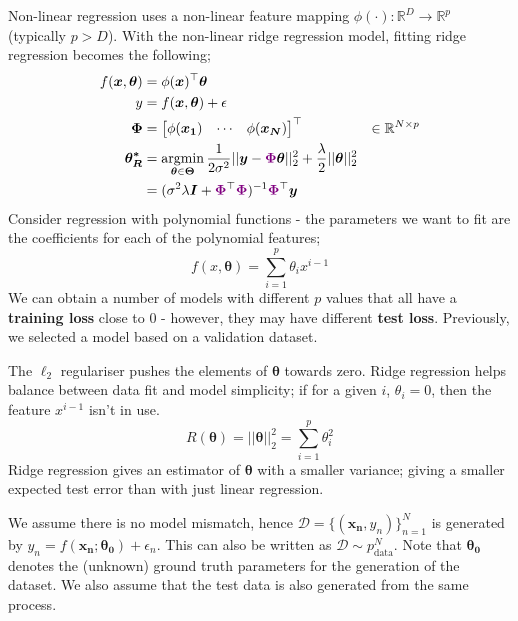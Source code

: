 \documentclass[a4paper, 12pt]{article}
\newcommand{\summation}[2]{\sum\limits_{#1}^{#2}}
\newcommand{\mat}[1]{\boldsymbol{#1}}
\renewcommand{\vec}[1]{\boldsymbol{#1}}
\DeclareMathOperator*{\argmin}{argmin}
\newcommand{\mbbr}[0]{\mathbb{R}}
\newcommand{\violet}[1]{\textcolor{violet}{#1}}
\begin{document}
                Non-linear regression uses a non-linear feature mapping $\phi(\cdot) : \mbbr^D \to \mbbr^p$ (typically $p > D$).
                With the non-linear ridge regression model, fitting ridge regression becomes the following;
                \begin{align*}
                    f(\vec{x}, \mat{\theta}) & = \phi(\vec{x})^\top\mat{\theta} \\
                    y & = f(\vec{x}, \mat{\theta}) + \epsilon \\
                    \mat{\Phi} & = \begin{bmatrix}
                        \phi(\vec{x_1}) & \cdots & \phi(\vec{x_N})
                    \end{bmatrix}^\top & \in \mbbr^{N \times p} \\
                    \mat{\theta_R^*} & = \argmin_{\mat{\theta} \in \mat{\Theta}} \frac{1}{2\sigma^2} || \mat{y} - \violet{\mat{\Phi}}\mat{\theta} ||_2^2 + \frac{\lambda}{2} || \mat{\theta} ||_2^2 \\
                    & = (\sigma^2\lambda \mat{I} + \violet{\mat{\Phi}}^\top\violet{\mat{\Phi}})^{-1}\violet{\mat{\Phi}}^\top\mat{y}
                \end{align*}
                Consider regression with polynomial functions - the parameters we want to fit are the coefficients for each of the polynomial features;
                $$f(x, \mat{\theta}) = \summation{i = 1}{p} \theta_i x^{i - 1}$$
                We can obtain a number of models with different $p$ values that all have a \textbf{training loss} close to 0 - however, they may have different \textbf{test loss}.
                Previously, we selected a model based on a validation dataset.
                \medskip

                The $\ell_2$ regulariser pushes the elements of $\mat{\theta}$ towards zero.
                Ridge regression helps balance between data fit and model simplicity; if for a given $i$, $\theta_i = 0$, then the feature $x^{i - 1}$ isn't in use.
                $$R(\mat{\theta}) = || \mat{\theta} ||_2^2 = \summation{i = 1}{p} \theta_i^2$$
                Ridge regression gives an estimator of $\mat{\theta}$ with a smaller variance; giving a smaller expected test error than with just linear regression.
                \medskip

                We assume there is no model mismatch, hence $\mathcal{D} = \{(\vec{x_n}, y_n)\}_{n = 1}^N$ is generated by $y_n = f(\vec{x_n}; \mat{\theta_0}) + \epsilon_n$.
                This can also be written as $\mathcal{D} \sim p_\text{data}^N$.
                Note that $\mat{\theta_0}$ denotes the (unknown) ground truth parameters for the generation of the dataset.
                We also assume that the test data is also generated from the same process.
                \medskip
\end{document}
